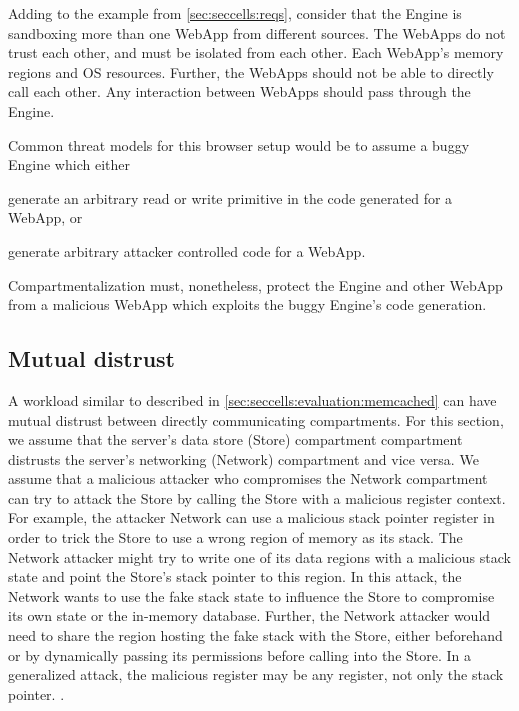 Adding to the example from \autoref{sec:seccells:reqs}, consider that the
Engine is sandboxing more than one WebApp from different sources.
The WebApps do not trust each other, and must be isolated from each other.
Each WebApp's memory regions and OS resources.
Further, the WebApps should not be able to directly call each other.
Any interaction between WebApps should pass through the Engine.

Common threat models for this browser setup would be to assume a buggy Engine
which either
\begin{inparaenum}
      \item generate an arbitrary read or write primitive in the code generated
            for a WebApp, or 
      \item generate arbitrary attacker controlled code for a WebApp.
\end{inparaenum}
Compartmentalization must, nonetheless, protect the Engine and other WebApp 
from a malicious WebApp which exploits the buggy Engine's code generation.

\subsection{Mutual distrust} 
A workload similar to  described in 
\autoref{sec:seccells:evaluation:memcached} can have mutual distrust
between directly communicating compartments.
For this section, we assume that the server's data store (Store) compartment
compartment distrusts the server's networking (Network) compartment and
vice versa.
We assume that a malicious attacker who compromises the Network compartment
can try to attack the Store by calling the Store with a malicious register
context.
For example, the attacker Network can use a malicious stack pointer register 
in order to trick the Store to use a wrong region of memory as its stack.
The Network attacker might try to write one of its data regions with a malicious
stack state and point the Store's stack pointer to this region.
In this attack, the Network wants to use the fake stack state to influence the
Store to compromise its own state or the in-memory database.
Further, the Network attacker would need to share the region hosting the fake
stack with the Store, either beforehand or by dynamically passing its 
permissions before calling into the Store.
In a generalized attack, the malicious register may be any register, not
only the stack pointer.
.

